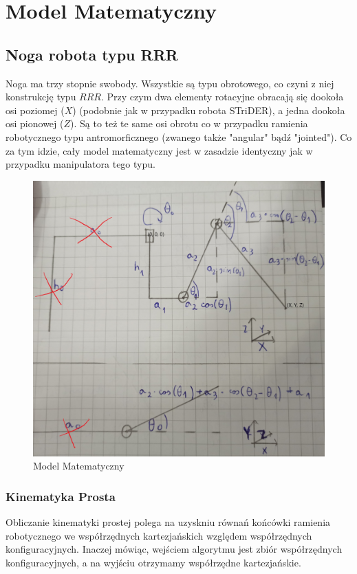 \chapter{Model Matematyczny}
\label{cha:math_model}

\section{Noga robota typu RRR}

Noga ma trzy stopnie swobody. Wszystkie są typu obrotowego, co czyni z niej konstrukcję typu $RRR$. Przy czym dwa elementy rotacyjne obracają się dookoła osi poziomej ($X$) (podobnie jak w przypadku robota STriDER), a jedna dookoła osi pionowej ($Z$). Są to też te same osi obrotu co w przypadku ramienia robotycznego typu antromorficznego (zwanego także "angular" bądź "jointed"). Co za tym idzie, cały model matematyczny jest w zasadzie identyczny jak w przypadku manipulatora tego typu.\\

\begin{figure}[h!]
\includegraphics[width=\textwidth]{img/math_model.jpg}
\caption{Model Matematyczny}
\label{math_model}
\end{figure}

\subsection{Kinematyka Prosta}
Obliczanie kinematyki prostej polega na uzyskniu równań końcówki ramienia robotycznego we współrzędnych kartezjańskich względem współrzędnych konfiguracyjnych. Inaczej mówiąc, wejściem algorytmu jest zbiór współrzędnych konfiguracyjnych, a na wyjściu otrzymamy współrzędne kartezjańskie.\cite{robot_manipulators}\\

